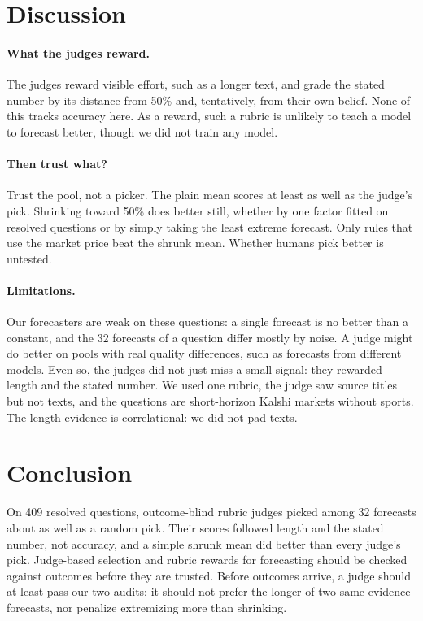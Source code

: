 \documentclass[letterpaper]{article} %
\begin{document}
\section{Discussion}
\paragraph{What the judges reward.} The judges reward visible effort, such as a longer text, and grade the stated number by its distance from 50\% and, tentatively, from their own belief. None of this tracks accuracy here. As a reward, such a rubric is unlikely to teach a model to forecast better, though we did not train any model.

\paragraph{Then trust what?} Trust the pool, not a picker. The plain mean scores at least as well as the judge's pick. Shrinking toward 50\% does better still, whether by one factor fitted on resolved questions or by simply taking the least extreme forecast. Only rules that use the market price beat the shrunk mean. Whether humans pick better is untested.

\paragraph{Limitations.} Our forecasters are weak on these questions: a single forecast is no better than a constant, and the 32 forecasts of a question differ mostly by noise. A judge might do better on pools with real quality differences, such as forecasts from different models. Even so, the judges did not just miss a small signal: they rewarded length and the stated number. We used one rubric, the judge saw source titles but not texts, and the questions are short-horizon Kalshi markets without sports. The length evidence is correlational: we did not pad texts.

\section{Conclusion}
On 409 resolved questions, outcome-blind rubric judges picked among 32 forecasts about as well as a random pick. Their scores followed length and the stated number, not accuracy, and a simple shrunk mean did better than every judge's pick. Judge-based selection and rubric rewards for forecasting should be checked against outcomes before they are trusted. Before outcomes arrive, a judge should at least pass our two audits: it should not prefer the longer of two same-evidence forecasts, nor penalize extremizing more than shrinking.
\end{document}
